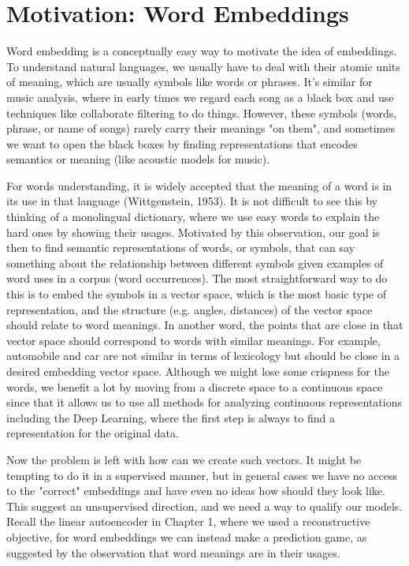 \documentclass[../main.tex]{subfiles}
\begin{document}
\section{Motivation: Word Embeddings}
Word embedding is a conceptually easy way to motivate the idea of embeddings. To understand natural languages, we usually have to deal with their atomic units of meaning, which are usually symbols like words or phrases. It's similar for music analysis, where in early times we regard each song as a black box and use techniques like collaborate filtering to do things. However, these symbols (words, phrase, or name of songs) rarely carry their meanings "on them", and sometimes we want to open the black boxes by finding representations that encodes semantics or meaning (like acoustic models for music). 
\par For words understanding, it is widely accepted that the meaning of a word is in its use in that language (Wittgenstein, 1953). It is not difficult to see this by thinking of a monolingual dictionary, where we use easy words to explain the hard ones by showing their usages. Motivated by this observation, our goal is then to find semantic representations of words, or symbols, that can say something about the relationship between different symbols given examples of word uses in a corpus (word occurrences). The most straightforward way to do this is to embed the symbols in a vector space, which is the most basic type of representation, and the structure (e.g. angles, distances) of the vector space should relate to word meanings. In another word, the points that are close in that vector space should correspond to words with similar meanings. For example, automobile and car are not similar in terms of lexicology but should be close in a desired embedding vector space. Although we might lose some crispness for the words, we benefit a lot by moving from a discrete space to a continuous space since that it allows us to use all methods for analyzing continuous representations including the Deep Learning, where the first step is always to find a representation for the original data. 
\par Now the problem is left with how can we create such vectors. It might be tempting to do it in a supervised manner, but in general cases we have no access to the "correct" embeddings and have even no ideas how should they look like. This suggest an unsupervised direction, and we need a way to qualify our models. Recall the linear autoencoder in Chapter 1, where we used a reconstructive objective, for word embeddings we can instead make a prediction game, as suggested by the observation that word meanings are in their usages. 
\end{document}
